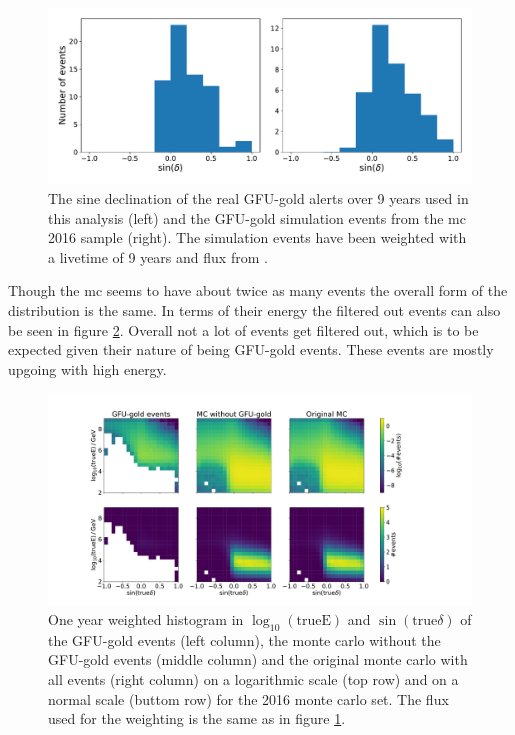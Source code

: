 \begin{figure}
    \centering
    \includegraphics[width=12cm]{Plots/03_data/gfu_gold_comp.pdf}
    \caption{The sine declination of the real GFU-gold alerts over 9 years used in this analysis (left) and the GFU-gold simulation events from the mc 2016 sample (right). The simulation events have been weighted with a livetime of 9 years and flux from \cite{flux}.}
    \label{fig:gfu_gold_comp}
\end{figure}
Though the mc seems to have about twice as many events the overall form of the distribution is the same.
In terms of their energy the filtered out events can also be seen in figure \ref{fig:energy}.
Overall not a lot of events get filtered out, which is to be expected given their nature of being GFU-gold events.
These events are mostly upgoing with high energy.
\begin{figure}
    \centering
    \includegraphics[width=16cm]{Plots/03_data/cleaned_mc_energy_test.pdf}
    \caption{One year weighted histogram in $\log_{10}(\text{trueE})$ and $\sin{(\text{true}\delta)}$ of the GFU-gold events (left column), the monte carlo without the GFU-gold events (middle column) and the original monte carlo with all events (right column) on a logarithmic scale (top row) and on a normal scale (buttom row) for the 2016 monte carlo set. The flux used for the weighting is the same as in figure \ref{fig:gfu_gold_comp}.}
    \label{fig:energy}
\end{figure}
